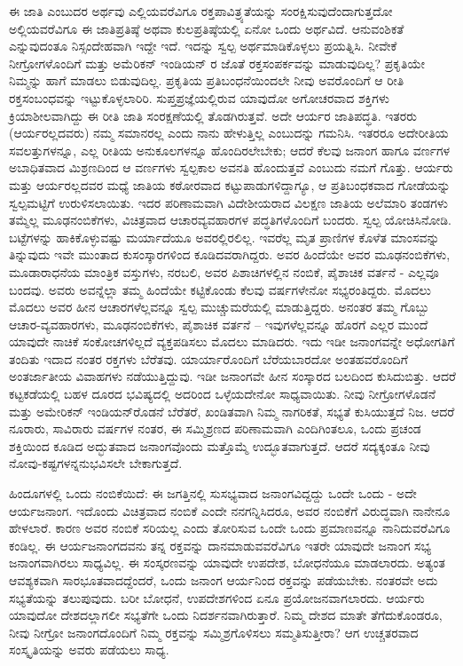 ಈ ಜಾತಿ ಎಂಬುದರ ಅರ್ಥವು ಎಲ್ಲಿಯವರೆವಿಗೂ ರಕ್ತಪಾವಿತ್ರ್ಯತೆಯನ್ನು ಸಂರಕ್ಷಿಸುವುದೆಂದಾಗುತ್ತದೋ ಅಲ್ಲಿಯವರೆವಿಗೂ ಈ ಜಾತಿಪ್ರತಿಷ್ಠೆ ಅಥವಾ ಕುಲಪ್ರತಿಷ್ಠೆಯಲ್ಲಿ ಏನೋ ಒಂದು ಅರ್ಥವಿದೆ. ಆನುವಂಶಿಕತೆ ಎನ್ನುವುದಂತೂ ನಿಸ್ಸಂದೇಹವಾಗಿ ಇದ್ದೇ ಇದೆ. ಇದನ್ನು ಸ್ವಲ್ಪ ಅರ್ಥಮಾಡಿಕೊಳ್ಳಲು ಪ್ರಯತ್ನಿಸಿ. ನೀವೇಕೆ ನೀಗ್ರೋಗಳೊಂದಿಗೆ ಮತ್ತು ಅಮೆರಿಕನ್ ಇಂಡಿಯನ್ ರ ಜೊತೆ ರಕ್ತಸಂಪರ್ಕವನ್ನು ಮಾಡುವುದಿಲ್ಲ? ಪ್ರಕೃತಿಯೇ ನಿಮ್ಮನ್ನು ಹಾಗೆ ಮಾಡಲು ಬಿಡುವುದಿಲ್ಲ. ಪ್ರಕೃತಿಯ ಪ್ರತಿಬಂಧನೆಯಿಂದಲೇ ನೀವು ಅವರೊಂದಿಗೆ ಆ ರೀತಿ ರಕ್ತಸಂಬಂಧವನ್ನು ಇಟ್ಟುಕೊಳ್ಳಲಾರಿರಿ. ಸುಪ್ತಪ್ರಜ್ಞೆಯಲ್ಲಿರುವ ಯಾವುದೋ ಅಗೋಚರವಾದ ಶಕ್ತಿಗಳು ಕ್ರಿಯಾಶೀಲವಾಗಿದ್ದು ಈ ರೀತಿ ಜಾತಿ ಸಂರಕ್ಷಣೆಯಲ್ಲಿ ತೊಡಗಿರುತ್ತವೆ. ಅದೇ ಆರ್ಯರ ಜಾತಿಪದ್ಧತಿ. ಇತರರು (ಆರ್ಯರಲ್ಲದವರು) ನಮ್ಮ ಸಮಾನರಲ್ಲ ಎಂದು ನಾನು ಹೇಳುತ್ತಿಲ್ಲ ಎಂಬುದನ್ನು ಗಮನಿಸಿ. ಇತರರೂ ಅದೇರೀತಿಯ ಸವಲತ್ತುಗಳನ್ನೂ, ಎಲ್ಲ ರೀತಿಯ ಅನುಕೂಲಗಳನ್ನೂ ಹೊಂದಿರಲೇಬೇಕು; ಆದರೆ ಕೆಲವು ಜನಾಂಗ ಹಾಗೂ ವರ್ಣಗಳ ಅಬಾಧಿತವಾದ ಮಿಶ್ರಣದಿಂದ ಆ ವರ್ಣಗಳು ಸ್ವಲ್ಪಕಾಲ ಅವನತಿ ಹೊಂದುತ್ತವೆ ಎಂಬುದು ನಮಗೆ ಗೊತ್ತು. ಆರ್ಯರು ಮತ್ತು ಆರ್ಯರಲ್ಲದವರ ಮಧ್ಯೆ ಜಾತಿಯ ಕಠೋರವಾದ ಕಟ್ಟುಪಾಡುಗಳಿದ್ದಾಗ್ಯೂ, ಆ ಪ್ರತಿಬಂಧಕವಾದ ಗೋಡೆಯನ್ನು ಸ್ವಲ್ಪಮಟ್ಟಿಗೆ ಉರುಳಿಸಲಾಯಿತು. ಇದರ ಪರಿಣಾಮವಾಗಿ ವಿದೇಶೀಯರಾದ ವಿಲಕ್ಷಣ ಜಾತಿಯ ಅಲೆಮಾರಿ ತಂಡಗಳು ತಮ್ಮೆಲ್ಲ ಮೂಢನಂಬಿಕೆಗಳು, ವಿಚಿತ್ರವಾದ ಆಚಾರವ್ಯವಹಾರಗಳ ಪದ್ಧತಿಗಳೊಂದಿಗೆ ಬಂದರು. ಸ್ವಲ್ಪ ಯೋಚಿಸಿನೋಡಿ. ಬಟ್ಟೆಗಳನ್ನು ಹಾಕಿಕೊಳ್ಳುವಷ್ಟು ಮರ್ಯಾದೆಯೂ ಅವರಲ್ಲಿರಲಿಲ್ಲ. ಇವರೆಲ್ಲ ಮೃತ ಪ್ರಾಣಿಗಳ ಕೊಳೆತ ಮಾಂಸವನ್ನು ತಿನ್ನುವುದು ಇವೇ ಮುಂತಾದ ಕುಸಂಸ್ಕಾರಗಳಿಂದ ಕೂಡಿದವರಾಗಿದ್ದರು. ಅವರ ಹಿಂದೆಯೇ ಅವರ ಮೂಢನಂಬಿಕೆಗಳು, ಮೂಡಾರಾಧನೆಯ ಮಾಂತ್ರಿಕ ವಸ್ತುಗಳು, ನರಬಲಿ, ಅವರ ಪಿಶಾಚಿಗಳಲ್ಲಿನ ನಂಬಿಕೆ, ಪೈಶಾಚಿಕ ವರ್ತನೆ - ಎಲ್ಲವೂ ಬಂದವು. ಅವರು ಅವನ್ನೆಲ್ಲಾ ತಮ್ಮ ಹಿಂದೆಯೇ ಕಟ್ಟಿಕೊಂಡು ಕೆಲವು ವರ್ಷಗಳೇನೋ ಸಭ್ಯರಂತಿದ್ದರು. ಮೊದಲು ಮೊದಲು ಅವರ ಹೀನ ಆಚಾರಗಳೆಲ್ಲವನ್ನೂ ಸ್ವಲ್ಪ ಮುಚ್ಚುಮರೆಯಲ್ಲಿ ಮಾಡುತ್ತಿದ್ದರು. ಅನಂತರ ತಮ್ಮ ಗೊಬ್ಬು ಆಚಾರ-ವ್ಯವಹಾರಗಳು, ಮೂಢನಂಬಿಕೆಗಳು, ಪೈಶಾಚಿಕ ವರ್ತನೆ – ಇವುಗಳೆಲ್ಲವನ್ನೂ ಹೊರಗೆ ಎಲ್ಲರ ಮುಂದೆ ಯಾವುದೇ ನಾಚಿಕೆ ಸಂಕೋಚಗಳಿಲ್ಲದೆ ವ್ಯಕ್ತಪಡಿಸಲು ಮೊದಲು ಮಾಡಿದರು. ಇದು ಇಡೀ ಜನಾಂಗವನ್ನೇ ಅಧೋಗತಿಗೆ ತಂದಿತು ಇದಾದ ನಂತರ ರಕ್ತಗಳು ಬೆರೆತವು. ಯಾರ್ಯಾರೊಂದಿಗೆ ಬೆರೆಯಬಾರದೋ ಅಂತಹವರೊಂದಿಗೆ ಅಂತರ್ಜಾತೀಯ ವಿವಾಹಗಳು ನಡೆಯುತ್ತಿದ್ದುವು. ಇಡೀ ಜನಾಂಗವೇ ಹೀನ ಸಂಸ್ಕಾರದ ಬಲದಿಂದ ಕುಸಿದುಬಿತ್ತು. ಆದರೆ ಕಟ್ಟಕಡೆಯಲ್ಲಿ ಬಹಳ ದೂರದ ಭವಿಷ್ಯದಲ್ಲಿ ಅದರಿಂದ ಒಳ್ಳೆಯದೇನೋ ಸಾಧ್ಯವಾಯಿತು. ನೀವು ನೀಗ್ರೋಗಳೊಡನೆ ಮತ್ತು ಅಮೇರಿಕನ್ ಇಂಡಿಯನ್‌ರೊಡನೆ ಬೆರೆತರೆ, ಖಂಡಿತವಾಗಿ ನಿಮ್ಮ ನಾಗರಿಕತೆ, ಸಭ್ಯತೆ ಕುಸಿಯುತ್ತದೆ ನಿಜ. ಆದರೆ ನೂರಾರು, ಸಾವಿರಾರು ವರ್ಷಗಳ ನಂತರ, ಈ ಸಮ್ಮಿಶ್ರಣದ ಪರಿಣಾಮವಾಗಿ ಎಂದಿಗಿಂತಲೂ, ಒಂದು ಪ್ರಚಂಡ ಶಕ್ತಿಯಿಂದ ಕೂಡಿದ ಅದ್ಭುತವಾದ ಜನಾಂಗವೊಂದು ಮತ್ತೊಮ್ಮೆ ಉದ್ಭೂತವಾಗುತ್ತದೆ. ಆದರೆ ಸದ್ಯಕ್ಕಂತೂ ನೀವು ನೋವು-ಕಷ್ಟಗಳನ್ನನುಭವಿಸಲೇ ಬೇಕಾಗುತ್ತದೆ.

ಹಿಂದೂಗಳಲ್ಲಿ ಒಂದು ನಂಬಿಕೆಯಿದೆ: ಈ ಜಗತ್ತಿನಲ್ಲಿ ಸುಸಭ್ಯವಾದ ಜನಾಂಗವಿದ್ದದ್ದು ಒಂದೇ ಒಂದು - ಅದೇ ಆರ್ಯಜನಾಂಗ. ಇದೊಂದು ವಿಚಿತ್ರವಾದ ನಂಬಿಕೆ ಎಂದೇ ನನಗನ್ನಿಸಿದರೂ, ಅವರ ನಂಬಿಕೆಗೆ ವಿರುದ್ಧವಾಗಿ ನಾನೇನೂ ಹೇಳಲಾರೆ. ಕಾರಣ ಅವರ ನಂಬಿಕೆ ಸರಿಯಲ್ಲ ಎಂದು ತೋರಿಸುವ ಒಂದೇ ಒಂದು ಪ್ರಮಾಣವನ್ನೂ ನಾನಿದುವರೆವಿಗೂ ಕಂಡಿಲ್ಲ. ಈ ಆರ್ಯಜನಾಂಗದವನು ತನ್ನ ರಕ್ತವನ್ನು ದಾನಮಾಡುವವರೆವಿಗೂ ಇತರೇ ಯಾವುದೇ ಜನಾಂಗ ಸಭ್ಯ ಜನಾಂಗವಾಗಿರಲು ಸಾಧ್ಯವಿಲ್ಲ. ಈ ಸಂಸ್ಕರಣವನ್ನು ಯಾವುದೇ ಉಪದೇಶ, ಬೋಧನೆಯೂ ಮಾಡಲಾರದು. ಅತ್ಯಂತ ಆವಶ್ಯಕವಾಗಿ ಸಾರಭೂತವಾದದ್ದೆಂದರೆ, ಒಂದು ಜನಾಂಗ ಆರ್ಯನಿಂದ ರಕ್ತವನ್ನು ಪಡೆಯಬೇಕು. ನಂತರವೇ ಅದು ಸಭ್ಯತೆಯನ್ನು ತಲುಪುವುದು. ಬರೀ ಬೋಧನೆ, ಉಪದೇಶಗಳಿಂದ ಏನೂ ಪ್ರಯೋಜನವಾಗಲಾರದು. ಆರ್ಯರು ಯಾವುದೋ ದೇಶದಲ್ಲಾಗಲೀ ಸಭ್ಯತೆಗೇ ಒಂದು ನಿದರ್ಶನವಾಗಿರುತ್ತಾರೆ. ನಿಮ್ಮ ದೇಶದ ಮಾತೇ ತೆಗೆದುಕೊಂಡರೂ, ನೀವು ನೀಗ್ರೋ ಜನಾಂಗದೊಂದಿಗೆ ನಿಮ್ಮ ರಕ್ತವನ್ನು ಸಮ್ಮಿಶ್ರಗೊಳಿಸಲು ಸಮ್ಮತಿಸುತ್ತೀರಾ? ಆಗ ಉಚ್ಚತರವಾದ ಸಂಸ್ಕೃತಿಯನ್ನು ಅವರು ಪಡೆಯಲು ಸಾಧ್ಯ.

